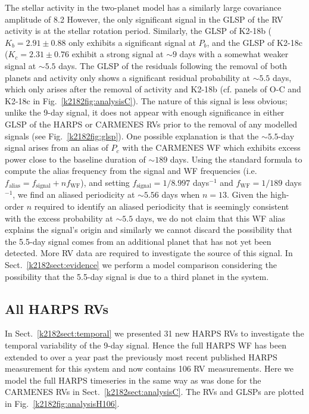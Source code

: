 The stellar activity in the two-planet model has a similarly large covariance amplitude of 8.2 
However, the only significant signal in the GLSP of the RV activity is at the stellar rotation period.
Similarly, the GLSP of K2-18b ($K_b=2.91\pm 0.88$ \mps{)}
only exhibits a significant signal at $P_b$, and the GLSP of K2-18c ($K_c=2.31\pm 0.76$ \mps{)} exhibit
a strong signal at $\sim 9$ days with a somewhat weaker signal at $\sim 5.5$ days. The GLSP of the
residuals following the removal of both planets and activity only shows a significant residual probability at
$\sim 5.5$ days, which only arises after the removal of activity and K2-18b (cf. panels of O-C and K2-18c in
Fig.~\ref{k2182fig:analysisC}). The nature of this signal is less obvious; unlike the 9-day signal, it does
not appear with enough significance in either GLSP of the HARPS or CARMENES RVs prior to the removal of any
modelled signals (see Fig.~\ref{k2182fig:glsp}). One possible explanation is that the $\sim 5.5$-day
signal arises from an alias of $P_c$ with the CARMENES WF which exhibits excess power close to the baseline
duration of $\sim 189$ days. Using the standard formula to compute the alias frequency from the signal and WF
frequencies (i.e. $f_{\text{alias}} = f_{\text{signal}} + n f_{\text{WF}}$),
and setting $f_{\text{signal}}=1/8.997$ days$^{-1}$ and
$f_{\text{WF}}=1/189$ days$^{-1}$, we find an aliased periodicity at $\sim 5.56$ days when $n=13$.
Given the high-order $n$ required to identify an aliased periodicity that is seemingly consistent with the excess
probability at $\sim 5.5$ days, we do not claim that this WF alias explains the signal's origin and similarly
we cannot discard the possibility that the 5.5-day  signal comes from an additional planet that has not yet been
detected. More RV data are required to investigate the source of this signal. In Sect.~\ref{k2182sect:evidence}
we  perform a model comparison considering the possibility that the 5.5-day signal is due to a third planet
in the system.

\subsection{All HARPS RVs} \label{k2182sect:newrvs}
In Sect.~\ref{k2182sect:temporal} we presented 31 new HARPS RVs to investigate the temporal variability of the
9-day signal. Hence the full HARPS WF has been extended to over a year past the previously most recent
published HARPS measurement for this system  and now contains 106 RV measurements.
Here we model the full HARPS timeseries in the same way  as was done for the CARMENES RVs in
Sect.~\ref{k2182sect:analysisC}. The RVs and GLSPs are plotted in Fig.~\ref{k2182fig:analysisH106}.

